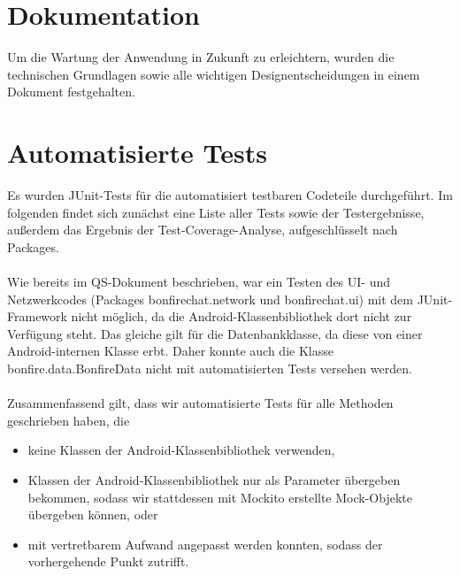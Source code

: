 




\clearpage
\section{Dokumentation}

Um die Wartung der Anwendung in Zukunft zu erleichtern, wurden die technischen Grundlagen
sowie alle wichtigen Designentscheidungen in einem Dokument festgehalten.






\clearpage
\section{Automatisierte Tests}

Es wurden JUnit-Tests für die automatisiert testbaren Codeteile durchgeführt.
Im folgenden findet sich zunächst eine Liste aller Tests sowie der Testergebnisse,
außerdem das Ergebnis der Test-Coverage-Analyse, aufgeschlüsselt nach Packages.
\\\\
Wie bereits im QS-Dokument beschrieben, war ein Testen des UI- und Netzwerkcodes
(Packages bonfirechat.network und bonfirechat.ui)
mit dem JUnit-Framework nicht möglich, da die Android-Klassenbibliothek dort nicht
zur Verfügung steht. Das gleiche gilt für die Datenbankklasse, da diese von einer
Android-internen Klasse erbt. Daher konnte auch die Klasse bonfire.data.BonfireData
nicht mit automatisierten Tests versehen werden.
\\\\
Zusammenfassend gilt, dass wir automatisierte Tests für alle Methoden geschrieben haben,
die
\begin{itemize}
\item keine Klassen der Android-Klassenbibliothek verwenden,
\item Klassen der Android-Klassenbibliothek nur als Parameter übergeben bekommen,
sodass wir stattdessen mit Mockito erstellte Mock-Objekte übergeben können, oder
\item mit vertretbarem Aufwand angepasst werden konnten, sodass der vorhergehende Punkt zutrifft.
\end{itemize}


